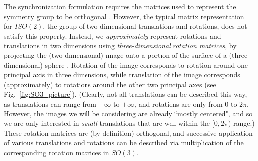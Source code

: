 \documentclass{pnastwo}
\newcommand{\fig}[0]{Fig.}
\begin{document}
\begin{article}
The synchronization formulation requires the matrices used to represent the symmetry group to be orthogonal \cite{singer2013spectral}.
%
However, the typical matrix representation for $ISO(2)$, the group of two-dimensional translations and rotations, does not satisfy this property.
%
Instead, we {\it approximately} represent rotations and translations in two dimensions using {\it three-dimensional rotation matrices}, by projecting the (two-dimensional) image onto a portion of the surface of a (three-dimensional) sphere \cite{singer2011angular}.
%
Rotation of the image corresponds to rotation around one principal axis in three dimensions, while translation of the image corresponds (approximately) to rotations around the other two principal axes (see \fig~\ref{fig:SO3_picture}). (Clearly, not all translations can be described this way, as translations can range from $-\infty$ to $+ \infty$, and rotations are only from $0$ to $2 \pi$. However, the images we will be considering are already ``mostly centered", and so we are only interested in {\em small} translations that are well within the $[0, 2\pi)$ range.)
%
These rotation matrices are (by definition) orthogonal, and successive application of various translations and rotations can be described via multiplication of the corresponding rotation matrices in $SO(3)$.


\end{article}
\end{document}
